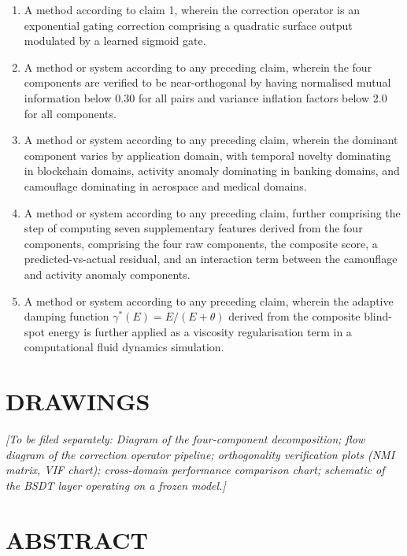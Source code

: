 \documentclass[12pt,a4paper]{article}
\begin{document}
\begin{enumerate}[label=\textbf{\arabic*.}]
\item A method according to claim 1, wherein the correction operator is an 
exponential gating correction comprising a quadratic surface output 
modulated by a learned sigmoid gate.

\item A method or system according to any preceding claim, wherein the 
four components are verified to be near-orthogonal by having normalised 
mutual information below 0.30 for all pairs and variance inflation factors 
below 2.0 for all components.

\item A method or system according to any preceding claim, wherein the 
dominant component varies by application domain, with temporal novelty 
dominating in blockchain domains, activity anomaly dominating in banking 
domains, and camouflage dominating in aerospace and medical domains.

\item A method or system according to any preceding claim, further 
comprising the step of computing seven supplementary features derived from 
the four components, comprising the four raw components, the composite 
score, a predicted-vs-actual residual, and an interaction term between the 
camouflage and activity anomaly components.

\item A method or system according to any preceding claim, wherein the 
adaptive damping function $\gamma^*(E) = E/(E + \theta)$ derived from the 
composite blind-spot energy is further applied as a viscosity regularisation 
term in a computational fluid dynamics simulation.

\end{enumerate}

\section{DRAWINGS}

\textit{[To be filed separately: Diagram of the four-component 
decomposition; flow diagram of the correction operator pipeline; 
orthogonality verification plots (NMI matrix, VIF chart); cross-domain 
performance comparison chart; schematic of the BSDT layer operating on a 
frozen model.]}

\newpage
\section*{ABSTRACT}
\end{document}
